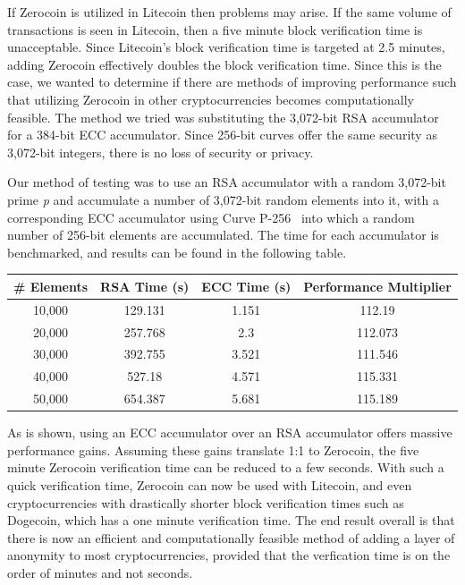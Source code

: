 \documentclass[11pt]{article}
\begin{document}
If Zerocoin is utilized in Litecoin then problems may arise. If the same volume of transactions is seen in Litecoin,
then a five minute block verification time is unacceptable. Since Litecoin's block verification time is targeted at 2.5
minutes, adding Zerocoin effectively doubles the block verification time. Since this is the case, we wanted to determine
if there are methods of improving performance such that utilizing Zerocoin in other cryptocurrencies becomes
computationally feasible. The method we tried was substituting the 3,072-bit RSA accumulator for a 384-bit ECC
accumulator. Since 256-bit curves offer the same security as 3,072-bit integers, there is no loss of security or
privacy.\cite{nistcase}

Our method of testing was to use an RSA accumulator with a random 3,072-bit prime \emph{p} and accumulate a number of
3,072-bit random elements into it, with a corresponding ECC accumulator using Curve P-256~\cite{curves} into which a
random number of 256-bit elements are accumulated. The time for each accumulator is benchmarked, and results can be
found in the following table.
\begin{center}
\begin{tabular}{|c|c|c|c|}
    \hline
    \textbf{\# Elements} & \textbf{RSA Time (s)} & \textbf{ECC Time (s)} & \textbf{Performance Multiplier} \\
    \hline
    10,000 & 129.131 & 1.151 & 112.19 \\
    \hline
    20,000 & 257.768 & 2.3 & 112.073 \\
    \hline
    30,000 & 392.755 & 3.521 & 111.546 \\
    \hline
    40,000 & 527.18 & 4.571 & 115.331 \\
    \hline
    50,000 & 654.387 & 5.681 & 115.189 \\
    \hline
\end{tabular}
\end{center}

As is shown, using an ECC accumulator over an RSA accumulator offers massive performance gains. Assuming these gains
translate 1:1 to Zerocoin, the five minute Zerocoin verification time can be reduced to a few seconds. With such a quick
verification time, Zerocoin can now be used with Litecoin, and even cryptocurrencies with drastically shorter block
verification times such as Dogecoin, which has a one minute verification time. The end result overall is that there is
now an efficient and computationally feasible method of adding a layer of anonymity to most cryptocurrencies, provided
that the verfication time is on the order of minutes and not seconds.
\end{document}
